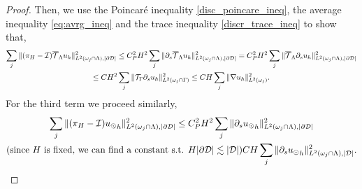 \begin{proof}
Then, we use the Poincar\'e inequality \eqref{disc_poincare_ineq}, the average inequality \eqref{eq:avrg_ineq} and the trace inequality \eqref{discr_trace_ineq} to show that,
\begin{multline*}
\sum _j  \|(\pi_H - \mathcal{I}){\overline{\mathcal{T}}_\Lambda} u_h\|^2_{L^2(\omega _j\cap \Lambda),|\partial\mathcal{D}|} 
\leq C_P^2 H^2 \sum _j \|\partial_s {\overline{\mathcal{T}}_\Lambda} u_h\|_{L^2(\omega _j\cap \Lambda),|\partial\mathcal{D}|}^2
= C_P^2 H^2 \sum _j \|{\overline{\mathcal{T}}_\Lambda} \partial_s  u_h\|_{L^2(\omega _j\cap \Lambda),|\partial\mathcal{D}|}^2
\\
\leq C H^2 \sum _j \|{\mathcal{T}_\Gamma} \partial_s u_h\|_{L^2(\omega _j \cap \Gamma)}^2
\leq C H \sum _j \|\nabla u_h\|_{L^2(\omega _j)}^2.
\end{multline*}
For the third term we proceed similarly,
\begin{multline*}
\sum _j \|(\pi_H - \mathcal{I}){u_{\odot}}_h\|^2_{L^2(\omega _j\cap \Lambda),|\partial\mathcal{D}|} \leq C_P^2 H^2 \sum _j \|\partial_s {u_{\odot}}_h\|_{L^2(\omega _j\cap \Lambda),|\partial\mathcal{D}|}^2
\\
(\text{since $H$ is fixed, we can find a constant s.t. } H|\partial\mathcal{D}| \lesssim |\mathcal{D}|) C H \sum _j \|\partial_s {u_{\odot}}_h\|_{L^2(\omega _j\cap \Lambda),|\mathcal{D}|}^2.
\end{multline*}

\end{proof}

